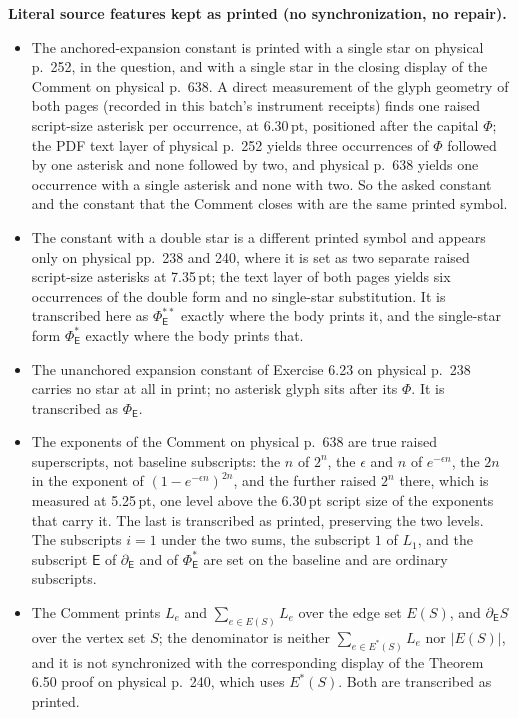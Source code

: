 \documentclass[11pt]{article}
\newcommand{\E}{\mathsf E}
\begin{document}
\medskip\noindent\textbf{Literal source features kept as printed (no synchronization, no repair).}
\begin{itemize}
\item The anchored-expansion constant is printed with a single star on physical p.\ 252, in the question, and with a single star in the closing display of the Comment on physical p.\ 638. A direct measurement of the glyph geometry of both pages (recorded in this batch's instrument receipts) finds one raised script-size asterisk per occurrence, at 6.30\,pt, positioned after the capital $\Phi$; the PDF text layer of physical p.\ 252 yields three occurrences of $\Phi$ followed by one asterisk and none followed by two, and physical p.\ 638 yields one occurrence with a single asterisk and none with two. So the asked constant and the constant that the Comment closes with are the same printed symbol.
\item The constant with a double star is a different printed symbol and appears only on physical pp.\ 238 and 240, where it is set as two separate raised script-size asterisks at 7.35\,pt; the text layer of both pages yields six occurrences of the double form and no single-star substitution. It is transcribed here as $\Phi^{**}_{\E}$ exactly where the body prints it, and the single-star form $\Phi^{*}_{\E}$ exactly where the body prints that.
\item The unanchored expansion constant of Exercise 6.23 on physical p.\ 238 carries no star at all in print; no asterisk glyph sits after its $\Phi$. It is transcribed as $\Phi_{\E}$.
\item The exponents of the Comment on physical p.\ 638 are true raised superscripts, not baseline subscripts: the $n$ of $2^{n}$, the $\epsilon$ and $n$ of $e^{-\epsilon n}$, the $2n$ in the exponent of $(1-e^{-\epsilon n})^{2n}$, and the further raised $2^{n}$ there, which is measured at 5.25\,pt, one level above the 6.30\,pt script size of the exponents that carry it. The last is transcribed as printed, preserving the two levels. The subscripts $i=1$ under the two sums, the subscript $1$ of $L_{1}$, and the subscript $\E$ of $\partial_{\E}$ and of $\Phi^{*}_{\E}$ are set on the baseline and are ordinary subscripts.
\item The Comment prints $L_{e}$ and $\sum_{e\in E(S)}L_{e}$ over the edge set $E(S)$, and $\partial_{\E}S$ over the vertex set $S$; the denominator is neither $\sum_{e\in E^{*}(S)}L_{e}$ nor $|E(S)|$, and it is not synchronized with the corresponding display of the Theorem 6.50 proof on physical p.\ 240, which uses $E^{*}(S)$. Both are transcribed as printed.

\end{itemize}
\end{document}
